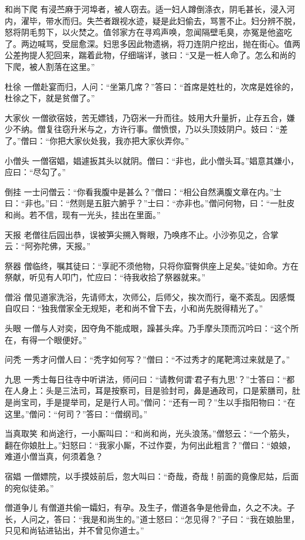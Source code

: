 \documentclass[12pt,UTF8]{ctexbook}
\begin{document}
和尚下爬
有浸苎麻于河埠者，被人窃去。适一妇人蹲倒涤衣，阴毛甚长，浸入河内，濯毕，带水而归。失苎者跟视水迹，疑是此妇偷去，骂詈不止。妇分辨不脱，怒将阴毛剪下，以火焚之。值邻家方在寻鸡声唤，忽闻隔壁毛臭，亦冤是他盗吃了。两边喊骂，受屈愈深。妇思多因此物遗祸，将刀连阴户挖出，抛在街心。值两公差拘提人犯回来，踹着此物，仔细端详，骇曰：“又是一桩人命了。怎么和尚的下爬，被人割落在这里。”

杜徐
一僧赴宴而归，人问：“坐第几席？”答曰：“首席是姓杜的，次席是姓徐的，杜徐之下，就是贫僧了。”

大家伙
一僧欲宿妓，苦无嫖钱，乃窃米一升而往。妓用大升量折，止存五合，嫌少不纳。僧复往窃升米与之，方许行事。僧愤恨，乃以头顶妓阴户。妓曰：“差了。”僧曰：“你把大家伙处我，我亦把大家伙弄你。”

小僧头
一僧宿娼，娼遽扳其头以就阴。僧曰：“非也，此小僧头耳。”娼意其嫌小，应曰：“尽勾了。”

倒挂
一士问僧云：“你看我腹中是甚么？”僧曰：“相公自然满腹文章在内。”士曰：“非也。”曰：“然则是五脏六腑乎？”士曰：“亦非也。”僧问何物，曰：“一肚皮和尚。若不信，现有一光头，挂出在里面。”

天报
老僧往后园出恭，误被笋尖搠入臀眼，乃唤疼不止。小沙弥见之，合掌云：“阿弥陀佛，天报。”

祭器
僧临终，嘱其徒曰：“享祀不须他物，只将你窟臀供座上足矣。”徒如命。方在祭献，听见有人叩门，忙应曰：“待我收拾了祭器就来。”

僧浴
僧见道家洗浴，先请师太，次师公，后师父，挨次而行，毫不紊乱。因感慨自叹曰：“独我僧家全无规矩，老和尚不曾下去，小和尚先脱得精光了。”

头眼
一僧与人对奕，因夺角不能成眼，躁甚头痒。乃手摩头顶而沉吟曰：“这个所在，有得一个眼便好。”

问秃
一秀才问僧人曰：“秃字如何写？”僧曰：“不过秀才的尾靶湾过来就是了。”

九思
一秀士每日往寺中听讲法，师问曰：“请教何谓‘君子有九思’？”士答曰：“都在人身上：头是三法司，耳是按察司，目是验封司，鼻是通政司，口是萦膳司，肚是尚宝司，手是提举司，足是行人司。”僧问：“还有一司？”生以手指阳物曰：“在这里。”僧问：“何司？”答曰：“僧纲司。”

当真取笑
和尚途行，一小厮叫曰：“和尚和尚，光头浪荡。”僧怒云：“一个筋头，翻在你娘肚上。”妇怒曰：“我家小厮，不过作耍，为何出此粗言？”僧曰：“娘娘，难道小僧当真，何须着急？

宿娼
一僧嫖院，以手摸妓前后，忽大叫曰：“奇哉，奇哉！前面的竟像尼姑，后面的宛似徒弟。”

僧道争儿
有僧道共偷一孀妇，有孕。及生子，僧道各争是他骨血，久之不决。子长，人问之，答曰：“我是和尚生的。”道士怒曰：“怎见得？”子曰：“我在娘胎里，只见和尚钻进钻出，并不曾见你道士。”
\end{document}
